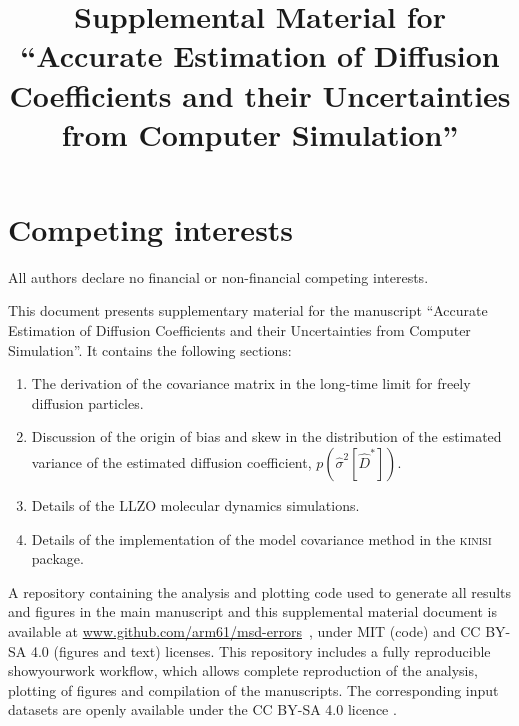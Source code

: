 \documentclass[reprint,superscriptaddress,nobibnotes,amsmath,amssymb,aps,prx,hidelinks,linenumbers]{revtex4-2}
\makeatletter
\newcommand{\papertitle}{Accurate Estimation of Diffusion Coefficients and their Uncertainties from Computer Simulation}
\newcommand{\prob}[1]{\ensuremath{p(#1)}}
\newcommand{\code}[1]{#1}
\newcommand{\Dest}{\ensuremath{\widehat{D}^*}}
\newcommand{\varest}[1]{\ensuremath{\widehat{\sigma}^2[#1]}}
\def\maketitle{
\@author@finish
\title@column\titleblock@produce
\suppressfloats[t]}
\makeatother
\begin{document}
\section*{Competing interests}
All authors declare no financial or non-financial competing interests.



\let\addcontentsline\oldaddcontentsline

\onecolumngrid
\clearpage 
\twocolumngrid

\appendix
\renewcommand\thesection{SI.\Roman{section}}
\renewcommand\thefigure{SI.\arabic{figure}}
\setcounter{figure}{0}
\renewcommand\theequation{SI.\arabic{equation}}
\setcounter{equation}{0}
\renewcommand\thetable{SI.\arabic{table}}
\setcounter{table}{0}
\renewcommand\thepage{SI.\arabic{page}}

\title{Supplemental Material for ``\papertitle''}
\maketitle

This document presents supplementary material for the manuscript ``\papertitle''.
It contains the following sections:
\begin{enumerate}
    \item The derivation of the covariance matrix in the long-time limit for freely diffusion particles.
    \item Discussion of the origin of bias and skew in the distribution of the estimated variance of the estimated diffusion coefficient, $\prob{\varest{\Dest}}$.
    \item Details of the LLZO molecular dynamics simulations.
    \item Details of the implementation of the model covariance method in the \textsc{kinisi} package.
\end{enumerate}
A repository containing the analysis and plotting code used to generate all results and figures in the main manuscript and this supplemental material document is available at \url{www.github.com/arm61/msd-errors}~\cite{mccluskey_github_2022}, under MIT (code) and CC BY-SA 4.0 (figures and text) licenses.
This repository includes a fully reproducible \code{showyourwork} workflow, which allows complete reproduction of the analysis, plotting of figures and compilation of the manuscripts.
The corresponding input datasets are openly available under the CC BY-SA 4.0 licence \cite{mccluskey_zenodo_2022,coles_llzo_zenodo_2022}. 
\end{document}
